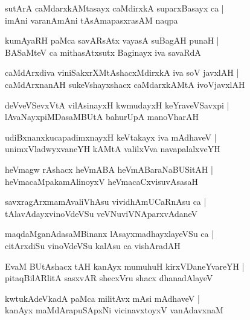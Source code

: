 \documentclass[twoside,12pt,openright]{book}
\newcounter{shloka}[chapter]
\begin{document}
\begin{shloka}
sutArA caMdarxkAMtasayx caMdirxkA suparxBasayx ca |\\
imAni varanAmAni tAsAmapasxrasAM naqpa 
\end{shloka}

\begin{shloka}
kumAyaRH paMca savARsAtx vayasA suBagAH punaH |\\
BASaMteV ca mithasAtxsutx Baginayx iva savaRdA 
\end{shloka}

\begin{shloka}
caMdArxdiva viniSakxrXMtAshacxMdirxkA iva soV javxlAH |\\
caMdArxnanAH sukeVshayxshacx caMdarxkAMtA ivoVjavxlAH 
\end{shloka}

\begin{shloka}
deVveVSevxVtA vilAsinayxH kwmudayxH keYraveVSavxpi |\\
lAvaNayxpiMDasaMBUtA bahurUpA manoVharAH
\end{shloka}

\begin{shloka}
udiBxnanxkucapadimxnayxH keVtakayx iva mAdhaveV |\\
unimxVladwyxvaneYH kAMtA valilxVva navapalalxveYH 
\end{shloka}

\begin{shloka}
heVmagw rAshacx heVmABA heVmABaraNaBUSitAH |\\
heVmacaMpakamAlinoyxV heVmacaCxvisuvAsasaH 
\end{shloka}

\begin{shloka}
savxragArxmamAvaliVhAsu vividhAmUCaRnAsu ca |\\
tAlavAdayxvinoVdeVSu veVNuviVNAparxvAdaneV
\end{shloka}

\begin{shloka}
maqdaMganAdasaMBinanx lAsayxmadhayxlayeVSu ca |\\
citArxdiSu vinoVdeVSu kalAsu ca vishAradAH 
\end{shloka}

\begin{shloka}
EvaM BUtAshacx tAH kanAyx mumuhuH kirxVDaneYvareYH |\\
pitaqBilARlitA sasxvAR shecxVru shacx dhanadAlayeV 
\end{shloka}

\begin{shloka}
kwtukAdeVkadA paMca militAvx mAsi mAdhaveV |\\
kanAyx maMdArapuSApxNi vicinavxtoyxV vanAdavxnaM 
\end{shloka}
\end{document}
